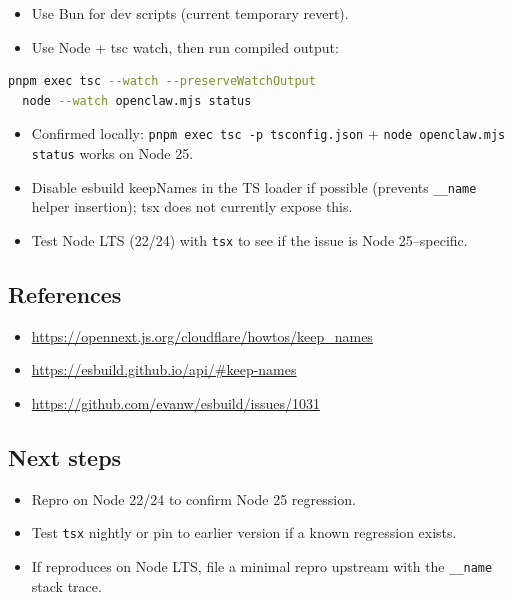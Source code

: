\begin{itemize}
  \item Use Bun for dev scripts (current temporary revert).
  \item Use Node + tsc watch, then run compiled output:
\end{itemize}


\begin{lstlisting}[language=bash]
  pnpm exec tsc --watch --preserveWatchOutput
  node --watch openclaw.mjs status
\end{lstlisting}


\begin{itemize}
  \item Confirmed locally: \texttt{pnpm exec tsc -p tsconfig.json} + \texttt{node openclaw.mjs status} works on Node 25.
  \item Disable esbuild keepNames in the TS loader if possible (prevents \texttt{\_\_name} helper insertion); tsx does not currently expose this.
  \item Test Node LTS (22/24) with \texttt{tsx} to see if the issue is Node 25–specific.
\end{itemize}


\subsection{References}


\begin{itemize}
  \item \href{https://opennext.js.org/cloudflare/howtos/keep\_names}{https://opennext.js.org/cloudflare/howtos/keep\_names}
  \item \href{https://esbuild.github.io/api/\#keep-names}{https://esbuild.github.io/api/\#keep-names}
  \item \href{https://github.com/evanw/esbuild/issues/1031}{https://github.com/evanw/esbuild/issues/1031}
\end{itemize}


\subsection{Next steps}


\begin{itemize}
  \item Repro on Node 22/24 to confirm Node 25 regression.
  \item Test \texttt{tsx} nightly or pin to earlier version if a known regression exists.
  \item If reproduces on Node LTS, file a minimal repro upstream with the \texttt{\_\_name} stack trace.
\end{itemize}



\clearpage
